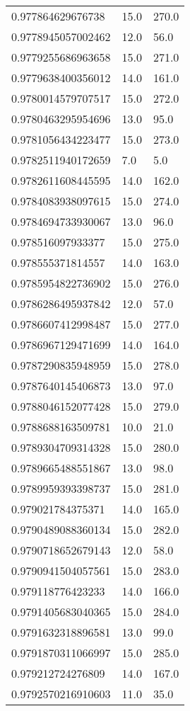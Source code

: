 \begin{center}
\begin{supertabular}[H]{p{0.30\textwidth}p{0.05\textwidth}p{0.05\textwidth}}
0.977864629676738 & 15.0 & 270.0 \\ 
0.9778945057002462 & 12.0 & 56.0 \\ 
0.9779255686963658 & 15.0 & 271.0 \\ 
0.9779638400356012 & 14.0 & 161.0 \\ 
0.9780014579707517 & 15.0 & 272.0 \\ 
0.9780463295954696 & 13.0 & 95.0 \\ 
0.9781056434223477 & 15.0 & 273.0 \\ 
0.9782511940172659 & 7.0 & 5.0 \\ 
0.9782611608445595 & 14.0 & 162.0 \\ 
0.9784083938097615 & 15.0 & 274.0 \\ 
0.9784694733930067 & 13.0 & 96.0 \\ 
0.978516097933377 & 15.0 & 275.0 \\ 
0.978555371814557 & 14.0 & 163.0 \\ 
0.9785954822736902 & 15.0 & 276.0 \\ 
0.9786286495937842 & 12.0 & 57.0 \\ 
0.9786607412998487 & 15.0 & 277.0 \\ 
0.9786967129471699 & 14.0 & 164.0 \\ 
0.9787290835948959 & 15.0 & 278.0 \\ 
0.9787640145406873 & 13.0 & 97.0 \\ 
0.9788046152077428 & 15.0 & 279.0 \\ 
0.9788688163509781 & 10.0 & 21.0 \\ 
0.9789304709314328 & 15.0 & 280.0 \\ 
0.9789665488551867 & 13.0 & 98.0 \\ 
0.9789959393398737 & 15.0 & 281.0 \\ 
0.979021784375371 & 14.0 & 165.0 \\ 
0.9790489088360134 & 15.0 & 282.0 \\ 
0.9790718652679143 & 12.0 & 58.0 \\ 
0.9790941504057561 & 15.0 & 283.0 \\ 
0.979118776423233 & 14.0 & 166.0 \\ 
0.9791405683040365 & 15.0 & 284.0 \\ 
0.9791632318896581 & 13.0 & 99.0 \\ 
0.9791870311066997 & 15.0 & 285.0 \\ 
0.979212724276809 & 14.0 & 167.0 \\ 
0.9792570216910603 & 11.0 & 35.0 \\ 

\end{supertabular}
\end{center}
